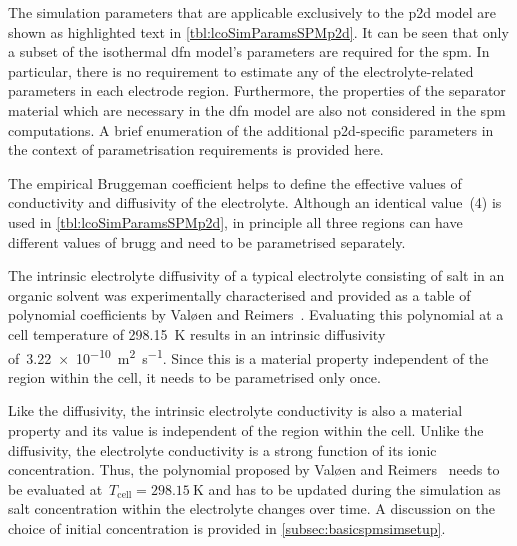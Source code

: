 The simulation parameters that are applicable exclusively to the \gls{p2d} model
are shown as  highlighted text in \cref{tbl:lcoSimParamsSPMp2d}. It  can be seen
that only a  subset of the isothermal \gls{dfn} model's  parameters are required
for the \gls{spm}. In particular, there is no requirement to estimate any of the
electrolyte-related  parameters  in  each  electrode  region.  Furthermore,  the
properties of the separator material which  are necessary in the \gls{dfn} model
are also  not considered in the  \gls{spm} computations. A brief  enumeration of
the additional  \gls{p2d}-specific parameters in the  context of parametrisation
requirements is provided here.

\begin{enumdescriptnum}[leftmargin=!,itemsep=1ex,labelwidth=\widthof{$\symbf{\text{brugg}_j}\ \scriptstyle (\times 3)$abc}
    ,partopsep=0pt
    ,topsep=0pt
    ]

      The  empirical Bruggeman  coefficient  helps
    to   define   the  effective   values   of   conductivity  and   diffusivity
    of   the  electrolyte.   Although  an   identical  value~(4)   is  used   in
    \cref{tbl:lcoSimParamsSPMp2d},  in  principle  all three  regions  can  have
    different values of brugg and need to be parametrised separately.

      The  intrinsic  electrolyte   diffusivity  of  a  typical
    electrolyte  consisting  of    salt in  an  organic  solvent  was
    experimentally  characterised   and  provided  as  a   table  of  polynomial
    coefficients  by  Valøen  and  Reimers~\cite{Valoen2005}.  Evaluating  this
    polynomial  at a  cell  temperature of  \SI{298.15}{\kelvin}  results in  an
    intrinsic  diffusivity  of~\SI{3.22e-10}{\meter\squared\per\second}.  Since
    this is  a material property independent  of the region within  the cell, it
    needs to be parametrised only once.

       Like    the   diffusivity,   the
    intrinsic electrolyte conductivity is also a material property and its value
    is independent  of the region within  the cell. Unlike the  diffusivity, the
    electrolyte conductivity  is a strong  function of its  ionic concentration.
    Thus, the polynomial proposed by Valøen and Reimers~\cite{Valoen2005} needs
    to  be evaluated  at~$T_\text{cell}= \SI{298.15}{\kelvin}$  and  has to  be
    updated during the  simulation as salt concentration  within the electrolyte
    changes over time. A discussion on the choice of initial concentration is
    provided in \cref{subsec:basicspmsimsetup}.


\end{enumdescriptnum}
